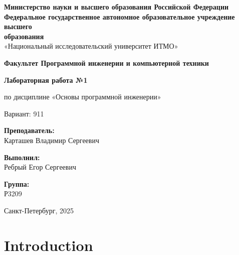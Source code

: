 \documentclass{scrreprt}
\date{}
\begin{document}
\begin{center}
	\textbf{Министерство науки и высшего образования Российской Федерации} \\
	\textbf{Федеральное государственное автономное образовательное учреждение высшего} \\
	\textbf{образования} \\
	«Национальный исследовательский университет ИТМО» \\
	
	\vspace{1cm}
	
	\textbf{Факультет Программной инженерии и компьютерной техники} \\
	
	\vspace{2cm}
	
	\textbf{Лабораторная работа №1} \\
	
	\vspace{1cm}
	
	по дисциплине «Основы программной инженерии» \\
	
	\vspace{1cm}
	
	Вариант: 911 \\
	
	\vspace{2cm}
	
\begin{flushright}
	\textbf{Преподаватель:} \\
	Карташев Владимир Сергеевич \\
	
	\vspace{0.5cm}
	
	\textbf{Выполнил:} \\
	Ребрый Егор Сергеевич \\
	
	\vspace{0.5cm}
	
	\textbf{Группа:} \\
	Р3209 \\
\end{flushright}
	
	\vfill
	
	Санкт-Петербург, 2025 \\
\end{center}

\tableofcontents

\chapter{Introduction}
\end{document}
